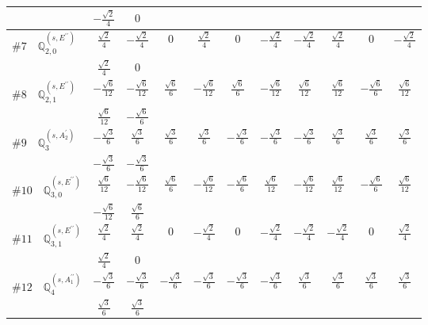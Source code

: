 \documentclass[fleqn,9pt,landscape]{jsarticle}
\begin{document}
\begin{center}
\begin{longtable}{lcccccccccc}
& $ - \frac{\sqrt{2}}{4} $ & $ 0 $ & $  $ & $  $ & $  $ & $  $ & $  $ & $  $ & $  $ & $  $ \\ \hline
$ \#7\quad \mathbb{Q}_{2,0}^{(s,E^{\prime\prime})} $ & $ \frac{\sqrt{2}}{4} $ & $ - \frac{\sqrt{2}}{4} $ & $ 0 $ & $ \frac{\sqrt{2}}{4} $ & $ 0 $ & $ - \frac{\sqrt{2}}{4} $ & $ - \frac{\sqrt{2}}{4} $ & $ \frac{\sqrt{2}}{4} $ & $ 0 $ & $ - \frac{\sqrt{2}}{4} $ \\
& $ \frac{\sqrt{2}}{4} $ & $ 0 $ & $  $ & $  $ & $  $ & $  $ & $  $ & $  $ & $  $ & $  $ \\ \hline
$ \#8\quad \mathbb{Q}_{2,1}^{(s,E^{\prime\prime})} $ & $ - \frac{\sqrt{6}}{12} $ & $ - \frac{\sqrt{6}}{12} $ & $ \frac{\sqrt{6}}{6} $ & $ - \frac{\sqrt{6}}{12} $ & $ \frac{\sqrt{6}}{6} $ & $ - \frac{\sqrt{6}}{12} $ & $ \frac{\sqrt{6}}{12} $ & $ \frac{\sqrt{6}}{12} $ & $ - \frac{\sqrt{6}}{6} $ & $ \frac{\sqrt{6}}{12} $ \\
& $ \frac{\sqrt{6}}{12} $ & $ - \frac{\sqrt{6}}{6} $ & $  $ & $  $ & $  $ & $  $ & $  $ & $  $ & $  $ & $  $ \\ \hline
$ \#9\quad \mathbb{Q}_{3}^{(s,A_{2}^{\prime})} $ & $ - \frac{\sqrt{3}}{6} $ & $ \frac{\sqrt{3}}{6} $ & $ \frac{\sqrt{3}}{6} $ & $ \frac{\sqrt{3}}{6} $ & $ - \frac{\sqrt{3}}{6} $ & $ - \frac{\sqrt{3}}{6} $ & $ - \frac{\sqrt{3}}{6} $ & $ \frac{\sqrt{3}}{6} $ & $ \frac{\sqrt{3}}{6} $ & $ \frac{\sqrt{3}}{6} $ \\
& $ - \frac{\sqrt{3}}{6} $ & $ - \frac{\sqrt{3}}{6} $ & $  $ & $  $ & $  $ & $  $ & $  $ & $  $ & $  $ & $  $ \\ \hline
$ \#10\quad \mathbb{Q}_{3,0}^{(s,E^{\prime\prime})} $ & $ \frac{\sqrt{6}}{12} $ & $ - \frac{\sqrt{6}}{12} $ & $ \frac{\sqrt{6}}{6} $ & $ - \frac{\sqrt{6}}{12} $ & $ - \frac{\sqrt{6}}{6} $ & $ \frac{\sqrt{6}}{12} $ & $ - \frac{\sqrt{6}}{12} $ & $ \frac{\sqrt{6}}{12} $ & $ - \frac{\sqrt{6}}{6} $ & $ \frac{\sqrt{6}}{12} $ \\
& $ - \frac{\sqrt{6}}{12} $ & $ \frac{\sqrt{6}}{6} $ & $  $ & $  $ & $  $ & $  $ & $  $ & $  $ & $  $ & $  $ \\ \hline
$ \#11\quad \mathbb{Q}_{3,1}^{(s,E^{\prime\prime})} $ & $ \frac{\sqrt{2}}{4} $ & $ \frac{\sqrt{2}}{4} $ & $ 0 $ & $ - \frac{\sqrt{2}}{4} $ & $ 0 $ & $ - \frac{\sqrt{2}}{4} $ & $ - \frac{\sqrt{2}}{4} $ & $ - \frac{\sqrt{2}}{4} $ & $ 0 $ & $ \frac{\sqrt{2}}{4} $ \\
& $ \frac{\sqrt{2}}{4} $ & $ 0 $ & $  $ & $  $ & $  $ & $  $ & $  $ & $  $ & $  $ & $  $ \\ \hline
$ \#12\quad \mathbb{Q}_{4}^{(s,A_{1}^{\prime\prime})} $ & $ - \frac{\sqrt{3}}{6} $ & $ - \frac{\sqrt{3}}{6} $ & $ - \frac{\sqrt{3}}{6} $ & $ - \frac{\sqrt{3}}{6} $ & $ - \frac{\sqrt{3}}{6} $ & $ - \frac{\sqrt{3}}{6} $ & $ \frac{\sqrt{3}}{6} $ & $ \frac{\sqrt{3}}{6} $ & $ \frac{\sqrt{3}}{6} $ & $ \frac{\sqrt{3}}{6} $ \\
& $ \frac{\sqrt{3}}{6} $ & $ \frac{\sqrt{3}}{6} $ & $  $ & $  $ & $  $ & $  $ & $  $ & $  $ & $  $ & $  $ \\
\end{longtable}
\end{center}
\end{document}
